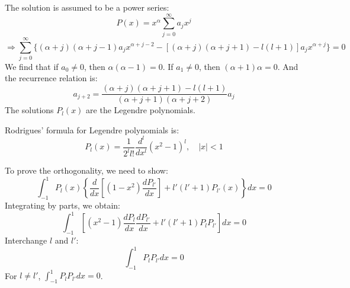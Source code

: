 \documentclass{article}
\begin{document}
	The solution is assumed to be a power series:
	\begin{equation}
		P(x) = x^\alpha \sum_{j=0}^{\infty} a_j x^j
	\end{equation}
	\begin{equation}
		\Rightarrow \sum_{j=0}^{\infty} \{ (\alpha+j)(\alpha+j-1)a_j x^{\alpha+j-2} - [(\alpha+j)(\alpha+j+1)-l(l+1)]a_j x^{\alpha+j} \} = 0
	\end{equation}
	We find that if $a_0 \neq 0$, then $\alpha(\alpha-1) = 0$. If $a_1 \neq 0$, then $(\alpha+1)\alpha=0$.
	And the recurrence relation is:
	\begin{equation}
		a_{j+2} = \frac{(\alpha+j)(\alpha+j+1)-l(l+1)}{(\alpha+j+1)(\alpha+j+2)} a_j
	\end{equation}
	The solutions $P_l(x)$ are the Legendre polynomials.
	
	Rodrigues' formula for Legendre polynomials is:
	\begin{equation}
		P_l(x) = \frac{1}{2^l l!} \frac{d^l}{dx^l}(x^2-1)^l, \quad |x|<1
	\end{equation}
	
	To prove the orthogonality, we need to show:
	\begin{equation}
		\int_{-1}^{1} P_l(x) \left\{ \frac{d}{dx}\left[(1-x^2)\frac{dP_{l'}}{dx}\right] + l'(l'+1)P_{l'}(x) \right\} dx = 0
	\end{equation}
	Integrating by parts, we obtain:
	\begin{equation}
		\int_{-1}^{1} \left[ (x^2-1)\frac{dP_l}{dx}\frac{dP_{l'}}{dx} + l'(l'+1)P_l P_{l'} \right] dx = 0
	\end{equation}
	Interchange $l$ and $l'$:
	\begin{equation}
		[l(l+1)-l'(l'+1)] \int_{-1}^{1} P_l P_{l'} dx = 0
	\end{equation}
	For $l \neq l'$, $\int_{-1}^{1} P_l P_{l'} dx = 0$.
	
\end{document}
